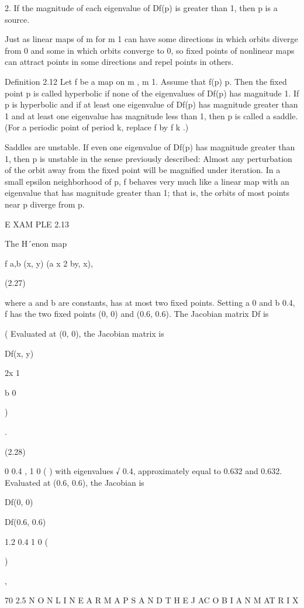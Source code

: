 \documentclass[12pt]{article}
\begin{document}
2. If the magnitude of each eigenvalue of Df(p) is greater than 1, then p is a source.

Just as linear maps of  m for m  1 can have some directions in which orbits diverge from 0 and some in which orbits converge to 0, so 
ﬁxed points of nonlinear maps can attract points in some directions and repel points in others.

Deﬁnition 2.12 Let f be a map on  m , m 
 1. Assume that f(p)  p. Then the ﬁxed point p is called hyperbolic if none of the eigenvalues of Df(p) has magnitude 1. If p is 
hyperbolic and if at least one eigenvalue of Df(p) has magnitude greater than 1 and at least one eigenvalue has magnitude less than 
1, then p is called a saddle. (For a periodic point of period k, replace f by f k .)

Saddles are unstable. If even one eigenvalue of Df(p) has magnitude greater than 1, then p is unstable in the sense previously 
described: Almost any perturbation of the orbit away from the ﬁxed point will be magniﬁed under iteration. In a small epsilon 
neighborhood of p, f behaves very much like a linear map with an eigenvalue that has magnitude greater than 1; that is, the orbits of 
most points near p diverge from p.

E XAM PLE 2.13

The H´enon map

f a,b (x, y)  (a  x 2  by, x),

(2.27)

where a and b are constants, has at most two ﬁxed points. Setting a  0 and b  0.4, f has the two ﬁxed points (0, 0) and (0.6, 0.6). 
The Jacobian matrix Df is

( Evaluated at (0, 0), the Jacobian matrix is

Df(x, y) 

2x 1

b 0

)

.

(2.28)

0 0.4 , 1 0 ( ) with eigenvalues  √ 0.4, approximately equal to 0.632 and 0.632. Evaluated at (0.6, 0.6), the Jacobian is

Df(0, 0) 

Df(0.6, 0.6) 

1.2 0.4 1 0 (

)

,

70 2.5 N O N L I N E A R M A P S A N D T H E J AC O B I A N M AT R I X
\end{document}
